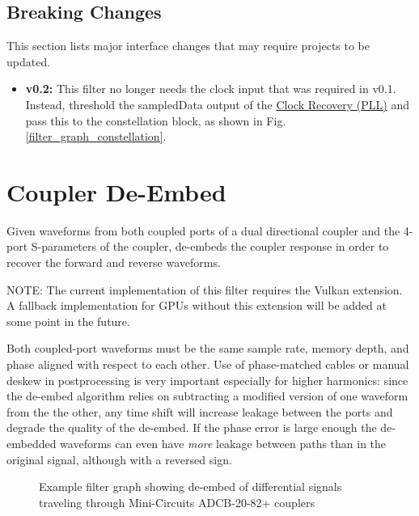 \subsection{Breaking Changes}

This section lists major interface changes that may require projects to be updated.

\begin{itemize}
\item \textbf{v0.2:} This filter no longer needs the clock input that was required in v0.1.
Instead, threshold the sampledData output of the \hyperref[filter:cdrpll]{Clock Recovery (PLL)} and pass this to the
constellation block, as shown in Fig. \ref{filter_graph_constellation}.
\end{itemize}

\pagebreak
\section{Coupler De-Embed}
\label{filter:couplerdbed}

Given waveforms from both coupled ports of a dual directional coupler and the 4-port S-parameters of the coupler,
de-embeds the coupler response in order to recover the forward and reverse waveforms.

NOTE: The current implementation of this filter requires the  Vulkan extension. A
fallback implementation for GPUs without this extension will be added at some point in the future.

Both coupled-port waveforms must be the same sample rate, memory depth, and phase aligned with respect to each other.
Use of phase-matched cables or manual deskew in postprocessing is very important especially for higher harmonics: since
the de-embed algorithm relies on subtracting a modified version of one waveform from the the other, any time shift will
increase leakage between the ports and degrade the quality of the de-embed. If the phase error is large enough the
de-embedded waveforms can even have \emph{more} leakage between paths than in the original signal, although with a
reversed sign.

\begin{figure}[h]
\centering
{}
\caption{Example filter graph showing de-embed of differential signals traveling through Mini-Circuits ADCB-20-82+
couplers}
\label{filter_graph_coupler_dbed}
\end{figure}

